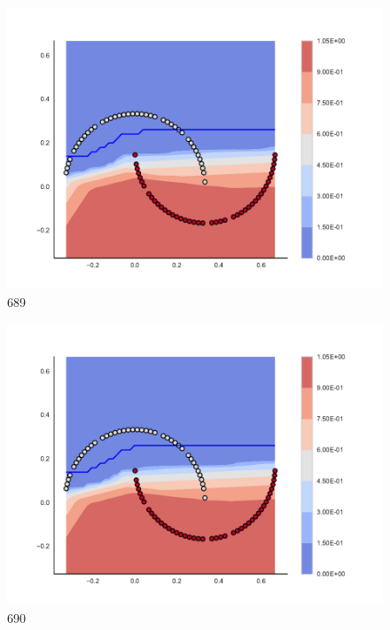 \begin{subfigure}[b]{0.09\textwidth}
    \includegraphics[clip, trim=2.35cm 1.75cm 4.5cm 0cm,width=\textwidth]{img/convergence/689.pdf}
    \caption{689}
    \label{fig:convergence_689}
\end{subfigure}
%
\begin{subfigure}[b]{0.09\textwidth}
    \includegraphics[clip, trim=2.35cm 1.75cm 4.5cm 0cm,width=\textwidth]{img/convergence/690.pdf}
    \caption{690}
    \label{fig:convergence_690}
\end{subfigure}
%
